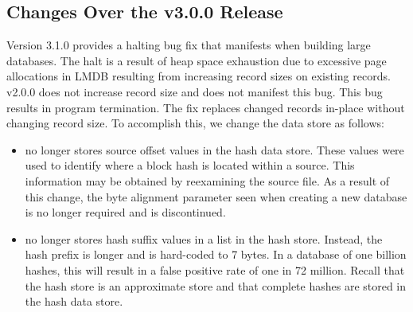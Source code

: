 \documentclass[11pt,fleqn]{article} %
\begin{document}
\subsection{Changes Over the \hdb v3.0.0 Release}
\hdb Version 3.1.0 provides a halting bug fix that manifests when building large databases. The halt is a result of heap space exhaustion due to excessive page allocations in LMDB resulting from increasing record sizes on existing records. \hdb v2.0.0 does not increase record size and does not manifest this bug. This bug results in program termination. The fix replaces changed records in-place without changing record size.  To accomplish this, we change the data store as follows:
\begin{itemize}
\item \hdb no longer stores source offset values in the hash data store.  These values were used to identify where a block hash is located within a source.  This information may be obtained by reexamining the source file.  As a result of this change, the byte alignment parameter seen when creating a new database is no longer required and is discontinued.
\item \hdb no longer stores hash suffix values in a list in the hash store.  Instead, the hash prefix is longer and is hard-coded to 7 bytes.  In a database of one billion hashes, this will result in a false positive rate of one in 72 million.  Recall that the hash store is an approximate store and that complete hashes are stored in the hash data store.
\end{itemize}
\end{document}
